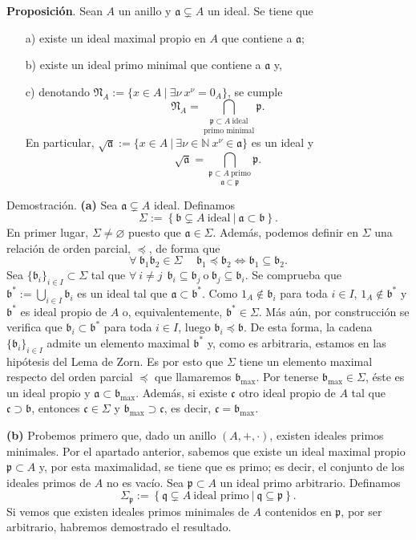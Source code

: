 \documentclass[a4paper,12pt]{article}
\newcommand{\N}{\mathbb{N}}
\newcommand{\p}{\mathfrak{p}}
\newcommand{\q}{\mathfrak{q}}
\newcommand{\af}{\mathfrak{a}}
\newcommand{\bfr}{\mathfrak{b}}
\newcommand{\cf}{\mathfrak{c}}
\newcommand{\Nf}{\mathfrak{N}}
\theoremstyle{definition}
\begin{document}
\textbf{Proposición}. Sean $A$ un anillo y $\af\subsetneq A$ un ideal. Se tiene que\begin{itemize}
    \item[a)] existe un ideal maximal propio en $A$ que contiene a $\af$;
    \item[b)] existe un ideal primo minimal que contiene a $\af$ y,
    \item[c)] denotando $\Nf_A:=\{x\in A\ |\ \exists\nu\ x^{\nu}=0_A\}$, se cumple$$\Nf_A=\underset{\text{primo minimal}}{\bigcap_{\p\subset A\ \text{ideal}}}\p.$$En particular, $\sqrt{\af}:=\{x\in A\ |\ \exists\nu\in\N\ x^\nu\in\af\}$ es un ideal y$$\sqrt{\af}=\underset{\af\subset\p}{\bigcap_{\p\subset A\ \text{primo}}}\p.$$
\end{itemize}
Demostración. \textbf{(a)} Sea $\af\subsetneq A$ ideal. Definamos$$\Sigma:=\left\{\bfr\subsetneq A\ \text{ideal}\ |\ \af\subset\bfr \right\}.$$
En primer lugar, $\Sigma\neq\varnothing$ puesto que $\af\in\Sigma$. Además, podemos definir en $\Sigma$ una relación de orden parcial, $\preceq$, de forma que$$\forall\ \bfr_1\bfr_2\in\Sigma\hspace{15pt}\bfr_1\preceq\bfr_2\Leftrightarrow\bfr_1\subseteq\bfr_2.$$
Sea $\{\bfr_i\}_{i\in I}\subset\Sigma$ tal que $\forall\ i\neq j\hspace{5pt}\bfr_i\subseteq\bfr_j\ \text{o}\ \bfr_j\subseteq\bfr_i$. Se comprueba que $\bfr^*:=\bigcup_{i\in I}\bfr_i$ es un ideal tal que $\af\subset\bfr^*$. 
Como $1_A\notin\bfr_i$ para toda $i\in I$, $1_A\notin\bfr^*$ y $\bfr^*$ es ideal propio de $A$ o, equivalentemente, $\bfr^*\in\Sigma$. Más aún, por construcción se verifica que $\bfr_i\subset\bfr^*$ para toda $i\in I$, luego $\bfr_i\preceq\bfr$. 
De esta forma, la cadena $\{\bfr_i\}_{i\in I}$ admite un elemento maximal $\bfr^*$ y, como es arbitraria, estamos en las hipótesis del Lema de Zorn. 
Es por esto que $\Sigma$ tiene un elemento maximal respecto del orden parcial $\preceq$ que llamaremos $\bfr_{\max}$.
Por tenerse $\bfr_{\max}\in\Sigma$, éste es un ideal propio y $\af\subset\bfr_{\max}$. Además, si existe $\cf$ otro ideal propio de $A$ tal que $\cf\supset\bfr$, entonces $\cf\in\Sigma$ y $\bfr_{\max}\supset\cf$, es decir, $\cf=\bfr_{\max}$.

\textbf{(b)} Probemos primero que, dado un anillo $(A,+,\cdot)$, existen ideales primos minimales. Por el apartado anterior, sabemos que existe un ideal maximal propio $\p\subset A$ y, por esta maximalidad, se tiene que es primo; es decir, el conjunto de los ideales primos de $A$ no es vacío. Sea $\p\subset A$ un ideal primo arbitrario.
Definamos$$\Sigma_{\p}:=\left\{\q\subsetneq A\ \text{ideal primo}\ |\ \q\subseteq\p \right\}.$$Si vemos que existen ideales primos minimales de $A$ contenidos en $\p$, por ser arbitrario, habremos demostrado el resultado.
\end{document}

